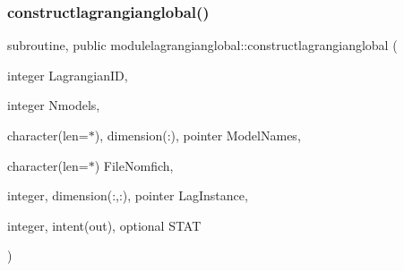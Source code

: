 \subsubsection{\texorpdfstring{constructlagrangianglobal()}{constructlagrangianglobal()}}
{\footnotesize\ttfamily subroutine, public modulelagrangianglobal\+::constructlagrangianglobal (\begin{DoxyParamCaption}\item[{integer}]{Lagrangian\+ID,  }\item[{integer}]{Nmodels,  }\item[{character(len=$\ast$), dimension(\+:), pointer}]{Model\+Names,  }\item[{character(len=$\ast$)}]{File\+Nomfich,  }\item[{integer, dimension(\+:,\+:), pointer}]{Lag\+Instance,  }\item[{integer, intent(out), optional}]{S\+T\+AT }\end{DoxyParamCaption})}

